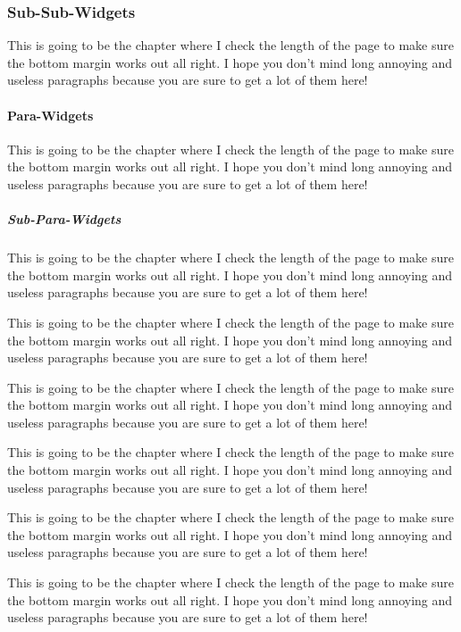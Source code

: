 \subsubsection{Sub-Sub-Widgets}

This is going to be the chapter where I check the length of the page
to make sure the bottom margin works out all right.  I hope you don't
mind long annoying and useless paragraphs because you are sure to get
a lot of them here!

\paragraph{Para-Widgets}

This is going to be the chapter where I check the length of the page
to make sure the bottom margin works out all right.  I hope you don't
mind long annoying and useless paragraphs because you are sure to get
a lot of them here!

\subparagraph{Sub-Para-Widgets}

This is going to be the chapter where I check the length of the page
to make sure the bottom margin works out all right.  I hope you don't
mind long annoying and useless paragraphs because you are sure to get
a lot of them here!

This is going to be the chapter where I check the length of the page
to make sure the bottom margin works out all right.  I hope you don't
mind long annoying and useless paragraphs because you are sure to get
a lot of them here!

This is going to be the chapter where I check the length of the page
to make sure the bottom margin works out all right.  I hope you don't
mind long annoying and useless paragraphs because you are sure to get
a lot of them here!

This is going to be the chapter where I check the length of the page
to make sure the bottom margin works out all right.  I hope you don't
mind long annoying and useless paragraphs because you are sure to get
a lot of them here!

This is going to be the chapter where I check the length of the page
to make sure the bottom margin works out all right.  I hope you don't
mind long annoying and useless paragraphs because you are sure to get
a lot of them here!

This is going to be the chapter where I check the length of the page
to make sure the bottom margin works out all right.  I hope you don't
mind long annoying and useless paragraphs because you are sure to get
a lot of them here!

